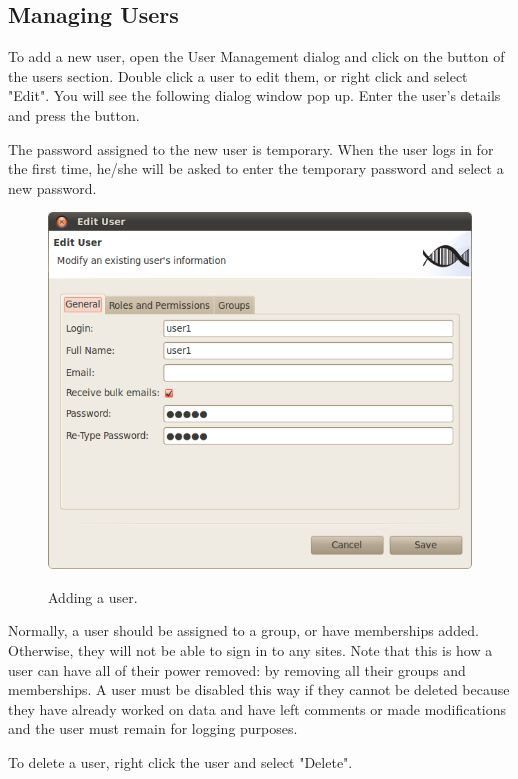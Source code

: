 \newpage
\subsection{Managing Users}
To add a new user, open the User Management dialog and click on the \fbox{+} button
of the users section. Double click a user to edit them, or right click and select "Edit".
You will see the following dialog window pop up. Enter the
user's details and press the  button.

The password assigned to the new user is temporary. When the user logs in for
the first time, he/she will be asked to enter the temporary password and
select a new password.

\begin{figure}[H]
  \centering
  \scalebox{0.5}
	   { \includegraphics*{screenshots/administration/edit_user_general} }
	   \caption{Adding a user.}
	   \label{fig:add_user}
\end{figure}

Normally, a user should be assigned to a group, or have memberships added. Otherwise,
they will not be able to sign in to any sites. Note that this is how a user can have all
of their power removed: by removing all their groups and memberships. A user must be
disabled this way if they cannot be deleted because they have already worked on data
and have left comments or made modifications and the user must remain for logging
purposes.

To delete a user, right click the user and select "Delete".

